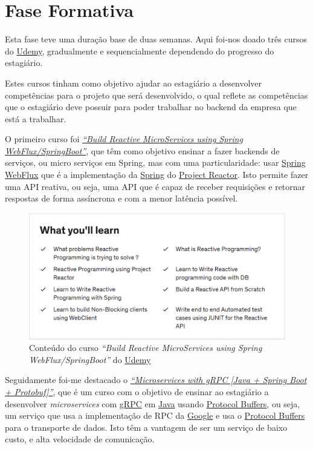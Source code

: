 \newpage

\section{Fase Formativa}

Esta fase teve uma duração base de duas semanas. Aqui foi-nos doado três cursos do \href{https://www.udemy.com/}{Udemy}, gradualmente e sequencialmente dependendo do progresso do estagiário.

Estes cursos tinham como objetivo ajudar ao estagiário a desenvolver competências para o projeto que será desenvolvido, o qual reflete as competências que o estagiário deve possuir para poder trabalhar no backend da empresa que está a trabalhar.

O primeiro curso foi \href{https://www.udemy.com/course/build-reactive-restful-apis-using-spring-boot-webflux/}{\textit{``Build Reactive MicroServices using Spring WebFlux/SpringBoot''}}, que têm como objetivo ensinar a fazer backends de serviços, ou micro serviços em Spring, mas com uma particularidade: usar \href{https://spring.io/reactive}{Spring WebFlux} que é a implementação da \href{https://spring.io/}{Spring} do \href{https://projectreactor.io/}{Project Reactor}. Isto permite fazer uma API reativa, ou seja, uma API que é capaz de receber requisições e retornar respostas de forma assíncrona e com a menor latência possível.

\begin{figure}[!hbt]
  \centering
  \includegraphics[width=14cm]{figuras/udemy1.png}
  \caption{Conteúdo do curso \textit{``Build Reactive MicroServices using Spring WebFlux/SpringBoot''} do \href{https://www.udemy.com/}{Udemy}}
  \label{fig:udemy1}
\end{figure}
\FloatBarrier

Seguidamente foi-me destacado o \href{https://www.udemy.com/course/grpc-the-complete-guide-for-java-developers/}{\textit{``Microservices with gRPC [Java + Spring Boot + Protobuf]''}}, que é um curso com o objetivo de ensinar ao estagiário a desenvolver \textit{microservices} com \href{https://grpc.io/}{gRPC} em \href{https://jdk.java.net/}{Java} usando \href{https://developers.google.com/protocol-buffers}{Protocol Buffers}, ou seja, um serviço que usa a implementação de RPC da \href{https://abc.xyz/}{Google} e usa o \href{https://developers.google.com/protocol-buffers}{Protocol Buffers} para o transporte de dados. Isto têm a vantagem de ser um serviço de baixo custo, e alta velocidade de comunicação.

